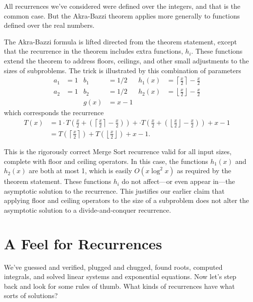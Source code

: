 All recurrences we've considered were defined over the integers, and
that is the common case.  But the Akra-Bazzi theorem applies more
generally to functions defined over the real numbers.

The Akra-Bazzi formula is lifted directed from the theorem statement,
except that the recurrence in the theorem includes extra functions,
$h_i$.  These functions extend the theorem to address floors,
ceilings, and other small adjustments to the sizes of subproblems.
The trick is illustrated by this combination of parameters
\begin{align*}
a_1 &= 1 & b_1 & = 1/2 & h_1(x) & = \left\lceil\frac{x}{2}\right\rceil -
\frac{x}{2}\\
a_2 &= 1 & b_2 & = 1/2 & h_2(x) & = \left\lfloor\frac{x}{2}\right\rfloor -
\frac{x}{2} \\
& & g(x) & = x - 1
\end{align*}
which corresponds the recurrence
\begin{align*}
T(x) & = 1 \cdot T\left(\frac{x}{2} + \left(\left\lceil\frac{x}{2}\right\rceil -\frac{x}{2}\right)\right) + 
 \cdot T\left(\frac{x}{2} +
\left(\left\lfloor\frac{x}{2}\right\rfloor -
  \frac{x}{2}\right)\right) + x - 1 \\
 & = T\left(\left\lceil\frac{x}{2}\right\rceil\right) +
 T\left(\left\lfloor\frac{x}{2}\right\rfloor\right) + x - 1.
\end{align*}

This is the rigorously correct Merge Sort recurrence valid for all
input sizes, complete with floor and ceiling operators.  In this case,
the functions $h_1(x)$ and $h_2(x)$ are both at most 1, which is
easily $O(x \log^2 x)$ as required by the theorem statement.  These
functions $h_i$ do not affect---or even appear in---the asymptotic
solution to the recurrence.  This justifies our earlier claim that
applying floor and ceiling operators to the size of a subproblem does
not alter the asymptotic solution to a divide-and-conquer recurrence.

\section{A Feel for Recurrences}

We've guessed and verified, plugged and chugged, found roots, computed
integrals, and solved linear systems and exponential equations.  Now
let's step back and look for some rules of thumb.  What kinds of
recurrences have what sorts of solutions?

